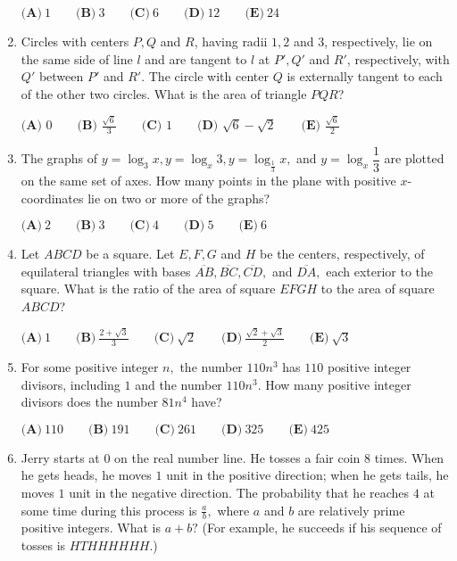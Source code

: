 \documentclass{article}
\begin{document}
\begin{enumerate}[label=\arabic*., itemsep=0.5em]
\(\textbf{(A)}\ 1\qquad\textbf{(B)}\ 3\qquad\textbf{(C)}\ 6\qquad\textbf{(D)}\ 12\qquad\textbf{(E)}\ 24\)\par \vspace{0.5em}\item Circles with centers \(P, Q\) and \(R\), having radii \(1, 2\) and \(3\), respectively, lie on the same side of line \(l\) and are tangent to \(l\) at \(P', Q'\) and \(R'\), respectively, with \(Q'\) between \(P'\) and \(R'\). The circle with center \(Q\) is externally tangent to each of the other two circles. What is the area of triangle \(PQR\)?

\(\textbf{(A) } 0\qquad \textbf{(B) } \frac{\sqrt{6}}{3}\qquad\textbf{(C) } 1\qquad\textbf{(D) } \sqrt{6}-\sqrt{2}\qquad\textbf{(E) }\frac{\sqrt{6}}{2}\)\par \vspace{0.5em}\item The graphs of \(y=\log_3 x, y=\log_x 3, y=\log_\frac{1}{3} x,\) and \(y=\log_x \dfrac{1}{3}\) are plotted on the same set of axes. How many points in the plane with positive \(x\)-coordinates lie on two or more of the graphs? 

\(\textbf{(A)}\ 2\qquad\textbf{(B)}\ 3\qquad\textbf{(C)}\ 4\qquad\textbf{(D)}\ 5\qquad\textbf{(E)}\ 6\)\par \vspace{0.5em}\item Let \(ABCD\) be a square. Let \(E, F, G\) and \(H\) be the centers, respectively, of equilateral triangles with bases \(\overline{AB}, \overline{BC}, \overline{CD},\) and \(\overline{DA},\) each exterior to the square. What is the ratio of the area of square \(EFGH\) to the area of square \(ABCD\)? 

\(\textbf{(A)}\ 1\qquad\textbf{(B)}\ \frac{2+\sqrt{3}}{3} \qquad\textbf{(C)}\ \sqrt{2} \qquad\textbf{(D)}\ \frac{\sqrt{2}+\sqrt{3}}{2} \qquad\textbf{(E)}\ \sqrt{3}\)\par \vspace{0.5em}\item For some positive integer \(n,\) the number \(110n^3\) has \(110\) positive integer divisors, including \(1\) and the number \(110n^3.\) How many positive integer divisors does the number \(81n^4\) have? 

\(\textbf{(A)}\ 110\qquad\textbf{(B)}\ 191\qquad\textbf{(C)}\ 261\qquad\textbf{(D)}\ 325\qquad\textbf{(E)}\ 425\)\par \vspace{0.5em}\item Jerry starts at \(0\) on the real number line. He tosses a fair coin \(8\) times. When he gets heads, he moves \(1\) unit in the positive direction; when he gets tails, he moves \(1\) unit in the negative direction. The probability that he reaches \(4\) at some time during this process is \(\frac{a}{b},\) where \(a\) and \(b\) are relatively prime positive integers. What is \(a + b?\) (For example, he succeeds if his sequence of tosses is \(HTHHHHHH.\))


\end{enumerate}
\end{document}
